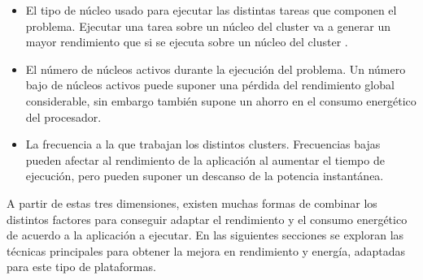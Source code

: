 \begin{itemize}
\item El tipo de núcleo usado para ejecutar las distintas tareas que
  componen el problema. Ejecutar una tarea sobre un núcleo del cluster \BIG
  va a generar un mayor rendimiento que si se ejecuta sobre un núcleo del
  cluster \LITTLE.
\item El número de núcleos activos durante la ejecución del problema. Un
  número bajo de núcleos activos puede suponer una pérdida del rendimiento
  global considerable, sin embargo también supone un ahorro en el consumo
  energético del procesador.
\item La frecuencia a la que trabajan los distintos clusters. Frecuencias
  bajas pueden afectar al rendimiento de la aplicación al aumentar el
  tiempo de ejecución, pero pueden suponer un descanso de la potencia
  instantánea.
\end{itemize}

A partir de estas tres dimensiones, existen muchas formas de combinar los
distintos factores para conseguir adaptar el rendimiento y el consumo
energético de acuerdo a la aplicación a ejecutar. En las siguientes
secciones se exploran las técnicas principales para obtener la mejora en
rendimiento y energía, adaptadas para este tipo de plataformas.


